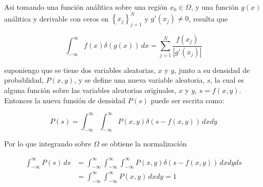 Asi tomando una función análitica sobre una región $x_0 \in \Omega$, y
una función $g(x)$ análitica y derivable con ceros en
$\left\{x_j\right\}_{j=1}^N$ y $g'(x_j) \neq 0 $, resulta que

\begin{equation}
  \int_{-\infty}^\infty f(x)\delta(g(x))\,dx = \sum_{j=1}^N
  \frac{f(x_j)}{|g'(x_j)|}
  \label{eq:delta-dirac-integral-2}
\end{equation}

suponiengo que se tiene dos variables aleatorias, $x$ y $y$,
junto a su densidad de probablidad, $P(x, y)$, y se define una
nueva variable aleatoria, $s$, la cual es alguna
función sobre las variables aleatorias originales, $x$ y $y$,
$s = f(x, y)$. Entonces la nueva funsión de densidad
$P(s)$ puede ser escrita como:

\begin{equation}
  P(s) = \int_{-\infty}^{\infty}\int_{-\infty}^{\infty} P(x, y)
  \delta(s - f(x, y))\, dx dy
  \label{eq:new-con-pdf}
\end{equation}

Por lo que integrando sobre $\Omega$ se obtiene la normalización

\begin{align*}
  \int_{-\infty}^{\infty} P(s)\, ds &=
  \int_{-\infty}^{\infty}\int_{-\infty}^{\infty}
  \int_{-\infty}^{\infty} P(x, y) \delta(s - f(x, y))\, dx dy ds\\
  &= \int_{-\infty}^{\infty} \int_{-\infty}^{\infty} P(x, y)\, dx dy = 1
  \label{eq:normalizacion-con-mult}
\end{align*}
